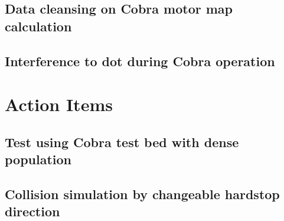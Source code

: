 \documentclass[a4paper,notitlepage]{article}
\begin{document}
\subsection{Data cleansing on Cobra motor map calculation}


\subsection{Interference to dot during Cobra operation}


\section{Action Items}

\subsection{Test using Cobra test bed with dense population}

\subsection{Collision simulation by changeable hardstop direction}
\end{document}
